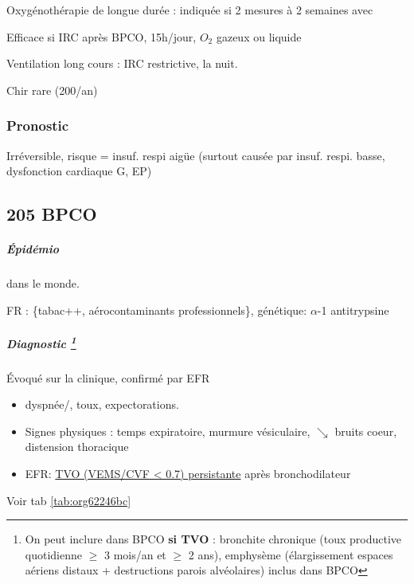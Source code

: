 \documentclass[11pt]{article}
\begin{document}
Oxygénothérapie de longue durée : indiquée si 2 mesures à 2 semaines avec


Efficace si  IRC après BPCO, 15h/jour, \(O_2\) gazeux ou liquide

Ventilation long cours : IRC restrictive, la nuit.

Chir rare (200/an)

\subsubsection{Pronostic}
\label{sec:orga882ed2}
\label{sec:org2ec66b4}
Irréversible, risque = insuf. respi aigüe (surtout causée par insuf. respi. basse, dysfonction
cardiaque G, EP)


\subsection{205 BPCO}
\label{sec:orgcf36f1d}

\subparagraph{Épidémio}
\label{sec:org5ef4651}
\inc dans le monde. 

FR : \{tabac++, aérocontaminants professionnels\}, génétique: \(\alpha\)-1 antitrypsine

\subparagraph{Diagnostic \footnote{On peut inclure dans BPCO \textbf{si TVO} : bronchite chronique (toux
productive quotidienne \(\ge\) 3 mois/an et \(\ge\) 2 ans), emphysème (élargissement espaces aériens distaux + destructions parois
alvéolaires) inclus dans BPCO}}
\label{sec:org18a4b1f}
Évoqué sur la clinique, confirmé par EFR
\begin{itemize}
\item dyspnée/, toux, expectorations.
\item Signes physiques  : \nearrow temps expiratoire, \searrow murmure vésiculaire, \(\searrow\) bruits coeur, distension thoracique
\item EFR: \uline{TVO (VEMS/CVF < 0.7) persistante} après bronchodilateur
\end{itemize}

Voir tab \ref{tab:org62246bc}
\end{document}
